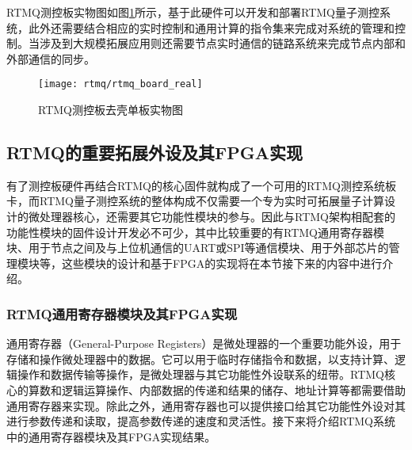 RTMQ测控板实物图如图\ref{fig:rtmq_board_real}所示，基于此硬件可以开发和部署RTMQ量子测控系统，此外还需要结合相应的实时控制和通用计算的指令集\cite[]{junhua03}来完成对系统的管理和控制。当涉及到大规模拓展应用则还需要节点实时通信的链路系统\cite[]{junhua02}来完成节点内部和外部通信的同步。


\begin{figure}
    \centering
    \caption[RTMQ测控板去壳单板实物图]{RTMQ测控板去壳单板实物图\label{fig:rtmq_board_real}}
    \texttt{[image: rtmq/rtmq\_board\_real]}
\end{figure}

\newpage
\subsection[RTMQ的重要外设拓展及其FPGA实现]{RTMQ的重要拓展外设及其FPGA实现}

有了测控板硬件再结合RTMQ的核心固件就构成了一个可用的RTMQ测控系统板卡，而RTMQ量子测控系统的整体构成不仅需要一个专为实时可拓展量子计算设计的微处理器核心，还需要其它功能性模块的参与。因此与RTMQ架构相配套的功能性模块的固件设计开发必不可少，其中比较重要的有RTMQ通用寄存器模块、用于节点之间及与上位机通信的UART或SPI等通信模块、用于外部芯片的管理模块等，这些模块的设计和基于FPGA的实现将在本节接下来的内容中进行介绍。

\subsubsection[RTMQ通用寄存器模块及其FPGA实现]{RTMQ通用寄存器模块及其FPGA实现}
通用寄存器（General-Purpose Registers）是微处理器的一个重要功能外设，用于存储和操作微处理器中的数据。它可以用于临时存储指令和数据，以支持计算、逻辑操作和数据传输等操作，是微处理器与其它功能性外设联系的纽带。RTMQ核心的算数和逻辑运算操作、内部数据的传递和结果的储存、地址计算等都需要借助通用寄存器来实现。除此之外，通用寄存器也可以提供接口给其它功能性外设对其进行参数传递和读取，提高参数传递的速度和灵活性。接下来将介绍RTMQ系统中的通用寄存器模块及其FPGA实现结果。

